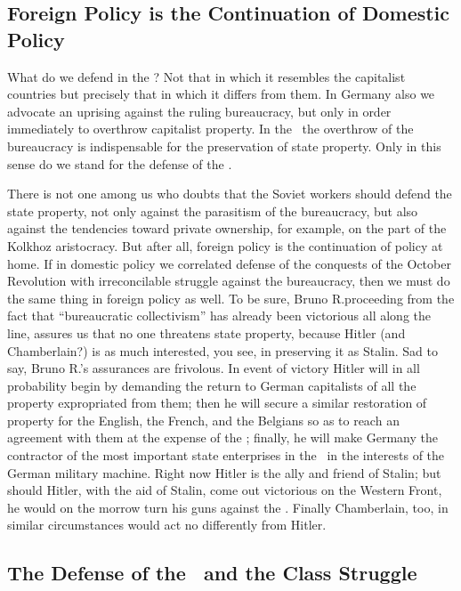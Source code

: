 \subsection*{Foreign Policy is the Continuation of Domestic Policy}

What do we defend in the \USSR? Not that in which it resembles the capitalist countries but precisely that in which it differs from them. In Germany also we advocate an uprising against the ruling bureaucracy, but only in order immediately to overthrow capitalist property. In the \USSR\ the overthrow of the bureaucracy is indispensable for the preservation of state property. Only in this sense do we stand for the defense of the \USSR.

There is not one among us who doubts that the Soviet workers should defend the state property, not only against the parasitism of the bureaucracy, but also against the tendencies toward private ownership, for example, on the part of the Kolkhoz aristocracy. But after all, foreign policy is the continuation of policy at home. If in domestic policy we correlated defense of the conquests of the October Revolution with irreconcilable struggle against the bureaucracy, then we must do the same thing in foreign policy as well. To be sure, Bruno R.\@ proceeding from the fact that “bureaucratic collectivism” has already been victorious all along the line, assures us that no one threatens state property, because Hitler (and Chamberlain?) is as much interested, you see, in preserving it as Stalin. Sad to say, Bruno R.’s assurances are frivolous. In event of victory Hitler will in all probability begin by demanding the return to German capitalists of all the property expropriated from them; then he will secure a similar restoration of property for the English, the French, and the Belgians so as to reach an agreement with them at the expense of the \USSR; finally, he will make Germany the contractor of the most important state enterprises in the \USSR\ in the interests of the German military machine. Right now Hitler is the ally and friend of Stalin; but should Hitler, with the aid of Stalin, come out victorious on the Western Front, he would on the morrow turn his guns against the \USSR. Finally Chamberlain, too, in similar circumstances would act no differently from Hitler.

\subsection*{The Defense of the \USSR\ and the Class Struggle}


